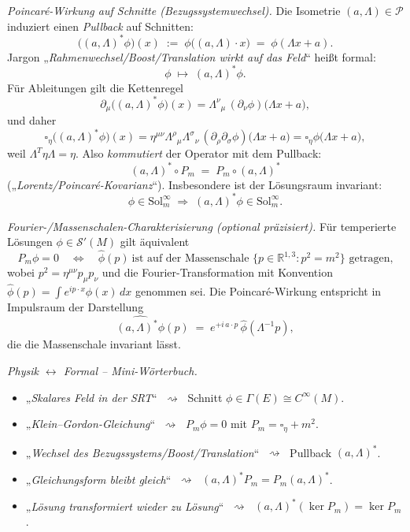 \documentclass[10pt, letterpaper]{article}
\newcommand{\R}{\mathbb{R}}
\begin{document}
\emph{Poincaré-Wirkung auf Schnitte (Bezugssystemwechsel).}
Die Isometrie $(a,\Lambda)\in\mathcal P$ induziert einen \emph{Pullback} auf Schnitten:
\[
\bigl((a,\Lambda)^*\phi\bigr)(x)
\;:=\; \phi\bigl((a,\Lambda)\cdot x\bigr)
\;=\; \phi(\Lambda x + a).
\]
Jargon „\emph{Rahmenwechsel/Boost/Translation wirkt auf das Feld}“ heißt formal:
\[
\phi \;\longmapsto\; (a,\Lambda)^*\phi.
\]
Für Ableitungen gilt die Kettenregel
\[
\partial_\mu\bigl((a,\Lambda)^*\phi\bigr)(x)
= \Lambda^\nu{}_{\mu}\, (\partial_\nu\phi)\bigl(\Lambda x+a\bigr),
\]
und daher
\[
\square_\eta\bigl((a,\Lambda)^*\phi\bigr)(x)
= \eta^{\mu\nu}\Lambda^\rho{}_{\mu}\Lambda^\sigma{}_{\nu}\,
(\partial_\rho\partial_\sigma\phi)\bigl(\Lambda x+a\bigr)
= \square_\eta \phi\bigl(\Lambda x+a\bigr),
\]
weil $\Lambda^T\eta\Lambda=\eta$. Also \emph{kommutiert} der Operator mit dem Pullback:
\[
\boxed{\quad (a,\Lambda)^*\circ P_m \;=\; P_m\circ (a,\Lambda)^* \quad}
\]
(„\emph{Lorentz/Poincaré-Kovarianz}“). Insbesondere ist der Lösungsraum invariant:
\[
\phi\in\mathrm{Sol}_m^\infty \;\Longrightarrow\; (a,\Lambda)^*\phi\in\mathrm{Sol}_m^\infty.
\]

\emph{Fourier-/Massenschalen-Charakterisierung (optional präzisiert).}
Für temperierte Lösungen $\phi\in \mathcal S'(M)$ gilt äquivalent
\[
P_m\phi=0 
\quad\Longleftrightarrow\quad
\widehat{\phi}(p)\ \text{ist auf der Massenschale } \{p\in\R^{1,3}:p^2=m^2\} \text{ getragen,}
\]
wobei $p^2=\eta^{\mu\nu}p_\mu p_\nu$ und die Fourier-Transformation mit Konvention
$\widehat{\phi}(p)=\int e^{ip\cdot x}\phi(x)\,dx$ genommen sei. 
Die Poincaré-Wirkung entspricht in Impulsraum der Darstellung
\[
\widehat{(a,\Lambda)^*\phi}(p) \;=\; e^{+i\,a\cdot p}\,\widehat{\phi}(\Lambda^{-1}p),
\]
die die Massenschale invariant lässt.

\emph{Physik $\leftrightarrow$ Formal – Mini-Wörterbuch.}
\begin{itemize}
  \item „\emph{Skalares Feld in der SRT}“ $\;\rightsquigarrow\;$ Schnitt $\phi\in\Gamma(E)\cong C^\infty(M)$.
  \item „\emph{Klein–Gordon-Gleichung}“ $\;\rightsquigarrow\;$ $P_m\phi=0$ mit $P_m=\square_\eta+m^2$.
  \item „\emph{Wechsel des Bezugssystems/Boost/Translation}“ $\;\rightsquigarrow\;$ Pullback $(a,\Lambda)^*$.
  \item „\emph{Gleichungsform bleibt gleich}“ $\;\rightsquigarrow\;$ $(a,\Lambda)^* P_m = P_m (a,\Lambda)^*$.
  \item „\emph{Lösung transformiert wieder zu Lösung}“ $\;\rightsquigarrow\;$ $(a,\Lambda)^*(\ker P_m)=\ker P_m$.
\end{itemize}
\end{document}
